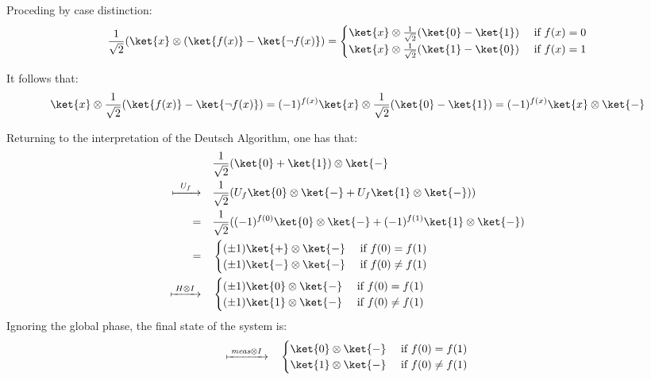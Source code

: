   Proceding by case distinction:
  \begin{equation}
    \frac{1}{\sqrt{2}}(\ket{x} \otimes (\ket{f(x)}-\ket{\neg f(x)}) = 
    \begin{cases}
      \ket{x} \otimes \frac{1}{\sqrt{2}}(\ket{0}-\ket{1}) &\text{ if } f(x)=0    \\
      \ket{x} \otimes \frac{1}{\sqrt{2}}(\ket{1}-\ket{0}) &\text{ if }   f(x)= 1 
    \end{cases}
  \end{equation}
  
 It follows that:
  \begin{equation}
   \ket{x} \otimes  \frac{1}{\sqrt{2}}(\ket{f(x)}-\ket{\neg f(x)}) = (-1)^{f(x)} \ket{x} \otimes \frac{1}{\sqrt{2}}(\ket{0}-\ket{1}) = (-1)^{f(x)} \ket{x} \otimes \ket{-}
  \end{equation}
  
  Returning to the interpretation of the Deutsch Algorithm, one has that:
  \begin{align}
    \quad & \frac{1}{\sqrt{2}}(\ket{0} + \ket{1}) \otimes \ket{-}\\
    \xmapsto{ \hspace{5 pt} U_{f} \hspace{5pt}} \quad & \frac{1}{\sqrt{2}}( U_{f} \ket{0} \otimes \ket{-} + U_{f} \ket{1} \otimes \ket{-})) \\
    = \quad & \frac{1}{\sqrt{2}}( (-1)^{f(0)} \ket{0} \otimes \ket{-} + (-1)^{f(1)} \ket{1} \otimes \ket{-}) \label{eq:Deutsch-Uf} \\
    = \quad &
    \begin{cases}
      (\pm 1) \ket{+} \otimes \ket{-} &\text{ if }   f(0)= f(1) \\
      (\pm 1) \ket{-} \otimes \ket{-} &\text{ if }   f(0) \neq f(1)
    \end{cases} \label{eq:Deutsch-Uf_2} \\
    \xmapsto{ \hspace{2pt} H \otimes I \hspace{2pt}} \quad & 
    \begin{cases}
      (\pm 1) \ket{0} \otimes \ket{-} &\text{ if }   f(0)= f(1) \\
      (\pm 1) \ket{1} \otimes \ket{-} &\text{ if }   f(0) \neq f(1)\\
    \end{cases} \label{eq:Deutsch-H_final}
  \end{align} 
  Ignoring the global phase, the final state of the system is:
  \begin{equation} \label{eq:Deutsch-meas}
    \begin{split}
  \xmapsto{ \hspace{2pt} \textit{meas} \otimes I \hspace{2pt}} \quad &
  \begin{cases}
     \ket{0}  \otimes \ket{-}  &\text{ if }   f(0)= f(1) \\
    \ket{1}  \otimes \ket{-} &\text{ if }   f(0) \neq f(1) 
  \end{cases} \\
  \end {split}
\end{equation}

